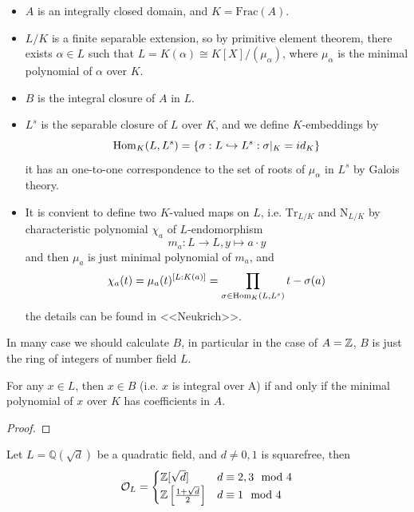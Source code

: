 \begin{itemize}
    \item \(A\) is an integrally closed domain, and \(K = \mathrm{Frac}(A)\).
    \item \(L/K\) is a finite separable extension, so by primitive element theorem, there exists \(\alpha \in L\) such that \(L = K(\alpha) \cong K[X]/(\mu_{\alpha})\), where \(\mu_\alpha\) is the minimal polynomial of \(\alpha\) over \(K\).
    \item \(B\) is the integral closure of \(A\) in \(L\).
    \item \(L^s\) is the separable closure of \(L\) over \(K\), and we define \(K\)-embeddings by
    \[\operatorname{Hom}_K(L,L^s) =  \{\sigma: L \hookrightarrow L^s: \sigma|_K = id_K\}\]
    it has an one-to-one correspondence to the set of roots of \(\mu_\alpha\) in \(L^s\) by Galois theory.
    \item It is convient to define two \(K\)-valued maps on \(L\), i.e. \(\mathrm{Tr}_{L/K}\) and \(\mathrm{N}_{L/K}\) by characteristic polynomial \(\chi_a\) of \(L\)-endomorphism 
    \[m_a : L \to L , y \mapsto a\cdot y\]
    and then \(\mu_a\) is just minimal polynomial of \(m_a\), and 
    \[\chi_a(t) = \mu_a(t)^{[L:K(a)]} = \prod_{\sigma \in \operatorname{Hom}_K(L,L^s)} t - \sigma(a)\]
    the details can be found in <<Neukrich>>.
\end{itemize}

In many case we should calculate \(B\), in particular in the case of \(A =\mathbb{Z}\), \(B\) is just the ring of integers of number field \(L\).

\begin{proposition}
    For any \(x \in L\), then \(x \in B\) (i.e. \(x\) is integral over A) if and only if the minimal polynomial of \(x\) over \(K\) has coefficients in \(A\).
\end{proposition}

\begin{proof}
    
\end{proof}

\begin{corollary}
    Let \(L = \mathbb{Q}(\sqrt{d})\) be a quadratic field, and \(d \neq 0,1\) is squarefree, then
    \[\mathcal{O}_L = \begin{cases}
        \mathbb{Z}[\sqrt{d}] & d \equiv 2,3 \mod 4\\
        \mathbb{Z}\left[\frac{1+\sqrt{d}}{2}\right] & d \equiv 1 \mod 4
    \end{cases}\]
\end{corollary}

